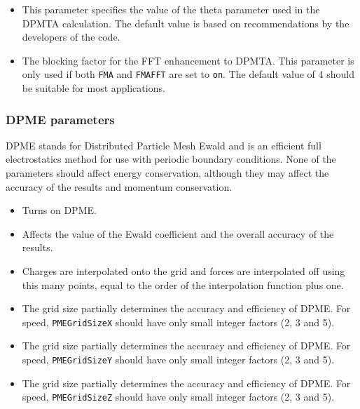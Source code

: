 \begin{itemize}
\item
{}
{This parameter specifies the value of the theta parameter
used in the DPMTA calculation.  The default value is based on
recommendations by the developers of the code.}

\item
{}
{The blocking factor for the FFT enhancement to DPMTA.
This parameter is only used if both \verb!FMA! and \verb!FMAFFT! 
are set to \verb!on!.  The default value of 4 should be suitable
for most applications.}

\end{itemize}

\subsubsection{DPME parameters}

DPME stands for Distributed Particle Mesh Ewald and is an efficient
full electrostatics method for use with periodic boundary conditions.
None of the parameters should affect energy conservation, although they may affect the accuracy of the results and momentum conservation.

\begin{itemize}

\item
{}
{Turns on DPME.}

\item
{}
{Affects the value of the Ewald coefficient and the overall accuracy of the results.}

\item
{}
{Charges are interpolated onto the grid and forces are interpolated off using this many points, equal to the order of the interpolation function plus one.}

\item
{}
{The grid size partially determines the accuracy and efficiency of DPME.
For speed, \verb!PMEGridSizeX! should have only small integer factors (2, 3 and 5).}

\item
{}
{The grid size partially determines the accuracy and efficiency of DPME.
For speed, \verb!PMEGridSizeY! should have only small integer factors (2, 3 and 5).}

\item
{}
{The grid size partially determines the accuracy and efficiency of DPME.
For speed, \verb!PMEGridSizeZ! should have only small integer factors (2, 3 and 5).}

\end{itemize}

